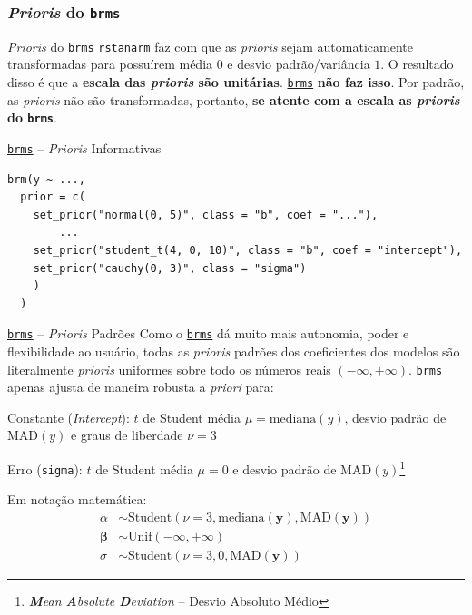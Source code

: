 \subsubsection{\textit{Prioris} do \texttt{brms}}
\begin{frame}{\textit{Prioris} do \texttt{brms}}
    \texttt{rstanarm} faz com que as \textit{prioris} sejam automaticamente
    transformadas para possuírem média $0$ e desvio padrão/variância $1$. O resultado
    disso é que a \textbf{escala das \textit{prioris} são unitárias}.
    \vfill
    \href{https://paul-buerkner.github.io/brms/}{\texttt{brms}} \textbf{não faz isso}.
    Por padrão, as \textit{prioris} não são transformadas, portanto, \textbf{se
    atente com a escala as \textit{prioris} do \texttt{brms}}.
\end{frame}

\begin{frame}[fragile]{\href{https://paul-buerkner.github.io/brms/}{\texttt{brms}} -- \textit{Prioris} Informativas}
    \begin{lstlisting}[basicstyle=\small]
brm(y ~ ...,
  prior = c(
    set_prior("normal(0, 5)", class = "b", coef = "..."),
        ...
    set_prior("student_t(4, 0, 10)", class = "b", coef = "intercept"),
    set_prior("cauchy(0, 3)", class = "sigma")
    )
  )
    \end{lstlisting}
\end{frame}

\begin{frame}{\href{https://paul-buerkner.github.io/brms/}{\texttt{brms}} -- \textit{Prioris} Padrões}
    Como o \href{https://paul-buerkner.github.io/brms/}{\texttt{brms}} dá
    muito mais autonomia, poder e flexibilidade ao usuário, todas as \textit{prioris}
    padrões dos coeficientes dos modelos são literalmente \textit{prioris} uniformes
    sobre todo os números reais $(-\infty, +\infty)$. \texttt{brms} apenas ajusta de
    maneira robusta a \textit{priori} para:
    \begin{vfilleditems}
        \item Constante (\textit{Intercept}): $t$ de Student média $\mu = \text{mediana}(y)$, desvio padrão de $\text{MAD}(y)$ e graus de liberdade $\nu = 3$
        \item Erro (\texttt{sigma}): $t$ de Student média $\mu = 0$ e desvio padrão de $\text{MAD}(y)$\footnote{\textit{\textbf{M}ean \textbf{A}bsolute \textbf{D}eviation} -- Desvio Absoluto Médio}
    \end{vfilleditems}
Em notação matemática:
$$
\begin{aligned}
\alpha &\sim \text{Student}(\nu=3, \text{mediana}({\boldsymbol{y}}), \text{MAD}({\boldsymbol{y}}))\\
\boldsymbol{\beta} &\sim \text{Unif}(-\infty, + \infty) \\
\sigma &\sim \text{Student}(\nu=3, 0, \text{MAD}({\boldsymbol{y}}))
\end{aligned}
$$
\end{frame}
